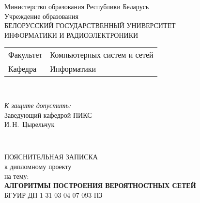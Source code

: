 \begin{titlepage}
  \begin{center}
    Министерство образования Республики Беларусь\\[1em]
    Учреждение образования\\
    БЕЛОРУССКИЙ ГОСУДАРСТВЕННЫЙ УНИВЕРСИТЕТ \\
    ИНФОРМАТИКИ И РАДИОЭЛЕКТРОНИКИ\\[1em]

    \begin{minipage}{\textwidth}
      \begin{flushleft}
        \begin{tabular}{ l l }
          Факультет & Компьютерных систем и сетей\\
          Кафедра   & Информатики
        \end{tabular}
      \end{flushleft}
    \end{minipage}\\[1em]

    \begin{flushright}
      \begin{minipage}{0.4\textwidth}
        \textit{К защите допустить:}\\[0.8em]
        Заведующий кафедрой ПИКС\\[0.45em]
        \underline{\hspace*{2.8cm}} И.\,Н.~Цырельчук
      \end{minipage}\\[2.2em]
    \end{flushright}

    {ПОЯСНИТЕЛЬНАЯ ЗАПИСКА}\\
    {к дипломному проекту}\\
    {на тему:}\\[1em]
    \textbf{\large АЛГОРИТМЫ ПОСТРОЕНИЯ ВЕРОЯТНОСТНЫХ СЕТЕЙ}\\[1em]


    {БГУИР ДП 1-31 03 04 07 093 ПЗ}\\[2em]
    

\end{center}
\end{titlepage}
